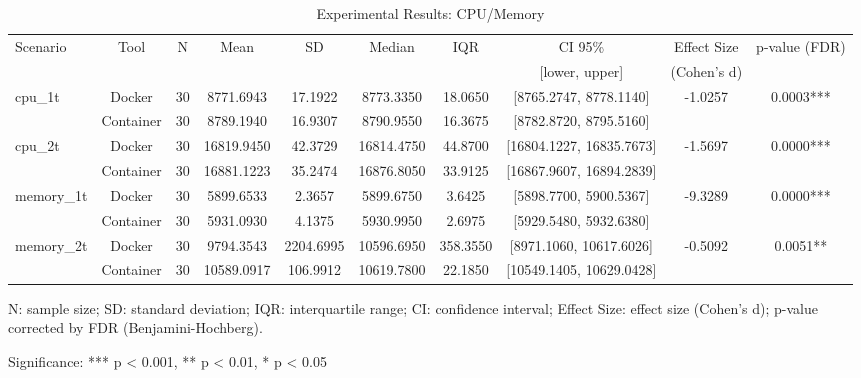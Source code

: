 \documentclass{article}
\begin{document}

\begin{table}[h]
\centering
\small
\caption{Experimental Results: CPU/Memory}
\label{tab:cpu_memory}
\begin{tabular}{lccccccccc}
\toprule
Scenario & Tool & N & Mean & SD & Median & IQR & CI 95\% & Effect Size & p-value (FDR) \\
 & & & & & & & [lower, upper] & (Cohen's d) & \\
\midrule
\multirow{2}{*}{cpu\_1t} & Docker & 30 & 8771.6943 & 17.1922 & 8773.3350 & 18.0650 & [8765.2747, 8778.1140] & -1.0257 & 0.0003*** \\
 & Container & 30 & 8789.1940 & 16.9307 & 8790.9550 & 16.3675 & [8782.8720, 8795.5160] &  &  \\
\midrule
\multirow{2}{*}{cpu\_2t} & Docker & 30 & 16819.9450 & 42.3729 & 16814.4750 & 44.8700 & [16804.1227, 16835.7673] & -1.5697 & 0.0000*** \\
 & Container & 30 & 16881.1223 & 35.2474 & 16876.8050 & 33.9125 & [16867.9607, 16894.2839] &  &  \\
\midrule
\multirow{2}{*}{memory\_1t} & Docker & 30 & 5899.6533 & 2.3657 & 5899.6750 & 3.6425 & [5898.7700, 5900.5367] & -9.3289 & 0.0000*** \\
 & Container & 30 & 5931.0930 & 4.1375 & 5930.9950 & 2.6975 & [5929.5480, 5932.6380] &  &  \\
\midrule
\multirow{2}{*}{memory\_2t} & Docker & 30 & 9794.3543 & 2204.6995 & 10596.6950 & 358.3550 & [8971.1060, 10617.6026] & -0.5092 & 0.0051** \\
 & Container & 30 & 10589.0917 & 106.9912 & 10619.7800 & 22.1850 & [10549.1405, 10629.0428] &  &  \\
\midrule
\bottomrule
\end{tabular}
\begin{tablenotes}
\small
\item N: sample size; SD: standard deviation; IQR: interquartile range; CI: confidence interval; Effect Size: effect size (Cohen's d); p-value corrected by FDR (Benjamini-Hochberg).
\item Significance: *** p < 0.001, ** p < 0.01, * p < 0.05
\end{tablenotes}
\end{table}

\end{document}
